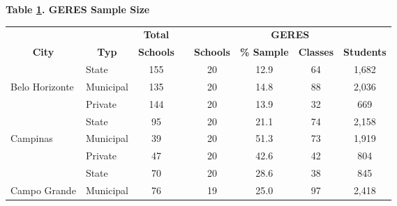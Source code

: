 \documentclass[a4paper, 12pt]{article}
\begin{document}
\begin{table}[H]
  \centering
            \label{table:SampleSize}                        \centering            \textbf{Table \ref{table:SampleSize}. GERES Sample Size} \\ 
  \begin{adjustbox}{width=1\textwidth}
    \begin{tabular}{llllllll}
    \toprule
          &       & \multicolumn{1}{c}{\textbf{Total}} &       & \multicolumn{4}{c}{\textbf{GERES}} \\
\cmidrule{3-3}\cmidrule{5-8}    \multicolumn{1}{c}{\textbf{City}} & \multicolumn{1}{c}{\textbf{Typ}} & \multicolumn{1}{p{4.39em}}{\textbf{ Schools }} &       & \multicolumn{1}{p{5.5em}}{\textbf{ Schools }} & \multicolumn{1}{p{5.5em}}{\textbf{ \% Sample }} & \multicolumn{1}{c}{\textbf{ Classes }} & \multicolumn{1}{c}{\textbf{ Students }} \\
    \midrule
          & State & \multicolumn{1}{c}{155 } &       & \multicolumn{1}{c}{20 } & \multicolumn{1}{c}{12.9} & \multicolumn{1}{c}{64 } & \multicolumn{1}{c}{1,682 } \\
    Belo Horizonte & Municipal & \multicolumn{1}{c}{135 } &       & \multicolumn{1}{c}{20 } & \multicolumn{1}{c}{14.8} & \multicolumn{1}{c}{88 } & \multicolumn{1}{c}{2,036 } \\
          & Private & \multicolumn{1}{c}{144 } &       & \multicolumn{1}{c}{20 } & \multicolumn{1}{c}{13.9} & \multicolumn{1}{c}{32 } & \multicolumn{1}{c}{669 } \\
    \midrule
          & State & \multicolumn{1}{c}{95 } &       & \multicolumn{1}{c}{20 } & \multicolumn{1}{c}{21.1} & \multicolumn{1}{c}{74 } & \multicolumn{1}{c}{2,158 } \\
    Campinas & Municipal & \multicolumn{1}{c}{39 } &       & \multicolumn{1}{c}{20 } & \multicolumn{1}{c}{51.3} & \multicolumn{1}{c}{73 } & \multicolumn{1}{c}{1,919 } \\
          & Private & \multicolumn{1}{c}{47 } &       & \multicolumn{1}{c}{20 } & \multicolumn{1}{c}{42.6} & \multicolumn{1}{c}{42 } & \multicolumn{1}{c}{804 } \\
    \midrule
          & State & \multicolumn{1}{c}{70 } &       & \multicolumn{1}{c}{20 } & \multicolumn{1}{c}{28.6} & \multicolumn{1}{c}{38 } & \multicolumn{1}{c}{845 } \\
    Campo Grande & Municipal & \multicolumn{1}{c}{76 } &       & \multicolumn{1}{c}{19 } & \multicolumn{1}{c}{25.0} & \multicolumn{1}{c}{97 } & \multicolumn{1}{c}{2,418 } \\

\end{tabular}
\end{adjustbox}
\end{table}
\end{document}
